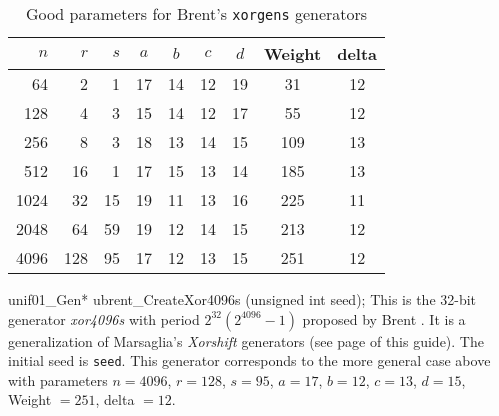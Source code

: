 \begin {table}
\centering
\label {tab:brentparam32}
\caption {Good parameters for Brent's \texttt{xorgens} generators}
\begin {tabular}{@{\extracolsep{15pt}}|rrrcccccc|}
\hline
    $n$ &  $r$  &   $s$ &   $a$ &  $b$ &  $c$ &  $d$ &  Weight & delta \\ 
\hline
 64  &   2  &  1  &  17  &  14  &  12  &  19  &  \phantom{1}31  &  12 \\
 128  &  4  &  3  &  15  &  14  &  12  &  17  &  \phantom{1}55  &  12 \\
 256  &  8  &  3  &  18  &  13  &  14  &  15  &  109  &  13 \\
 512  &  16  &  1  &  17  &  15  &  13  &  14  &  185  &  13 \\
 1024  &  32  &  15  &  19  &  11  &  13  &  16  &  225  &  11 \\
 2048  &  64  &  59  &  19  &  12  &  14  &  15  &  213  &  12 \\
 4096  &  128  &  95  &  17  &  12  &  13  &  15  &  251  &  12 \\
\hline
\end {tabular}
\end {table}
\code

unif01_Gen* ubrent_CreateXor4096s (unsigned int seed);
\endcode
  \tab This is the 32-bit generator  \textit{xor4096s} with period
 $2^{32}(2^{4096}-1)$ proposed by Brent \cite{rBRE04a}.
 It is a generalization of
 Marsaglia's \textit{Xorshift} generators \cite{rMAR03a} (see page
 \pageref{marsa-xorshift} of this guide).
  The initial seed is \texttt{seed}. This generator corresponds to the more
general case above with parameters
$n=4096$,  $r=128$,   $s=95$,  $a=17$,  $b=12$,  $c=13$, $d=15$,
 Weight $=251$,  delta $=12$.
%
  \endtab
\code


